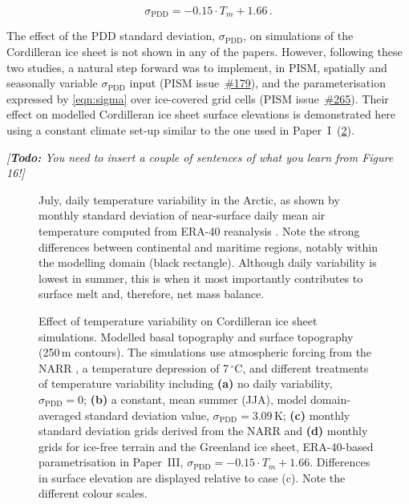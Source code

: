 \documentclass{article}
\newcommand{\todo}[1]{\emph{[\textbf{Todo:} #1]}}
\newcommand{\sPDD}[0]{\sigma_{\mathrm{PDD}}}
\newcommand{\unit}[1]{\ensuremath{\mathrm{#1}}}
\newcommand{\degree}[0]{\ensuremath{^{\circ}}}
\newcommand{\degC}[0]{\unit{{\degree}C}}
\newcommand{\CCLI}[0]{Paper~I}      %
\newcommand{\PSDP}[0]{Paper~III}    %
\newcommand{\issue}[1]{\href{https://github.com/pism/pism/issues/#1}{\##1}}
\begin{document}
\begin{equation}
    \label{eqn:sigma}
    \sPDD = -0.15 \cdot T_{m} + 1.66\,.
\end{equation}

The effect of the PDD standard deviation, $\sPDD$, on simulations of the
Cordilleran ice sheet is not shown in any of the papers. However, following
these two studies, a natural step forward was to implement, in PISM, spatially
and seasonally variable $\sPDD$ input (PISM issue~\issue{179}), and the
parameterisation expressed by \cref{eqn:sigma} over ice-covered grid cells
(PISM issue~\issue{265}). Their effect on modelled Cordilleran ice sheet
surface elevations is demonstrated here using a constant climate set-up similar
to the one used in \CCLI\ (\cref{fig:plot-sdeffect}).

\todo{You need to insert a couple of sentences of what you learn from Figure
      16!}

\begin{figure}
  \centering
  \caption{July, daily temperature variability in the Arctic, as shown by
           monthly standard deviation of near-surface daily mean air
           temperature computed from ERA-40 reanalysis
           \citep{Uppala.etal.2005}. Note the strong differences between
           continental and maritime regions, notably within the modelling domain
           (black rectangle). Although daily variability is lowest in summer,
           this is when it most importantly contributes to surface melt and,
           therefore, net mass balance.}
  \label{fig:plot-sdmap}
\end{figure}

\begin{figure}
  \centering
  \caption{Effect of temperature variability on Cordilleran ice sheet
           simulations. Modelled basal topography and surface topography
           (250\,m contours). The simulations use atmospheric forcing from the
           NARR \citep{Mesinger.etal.2006}, a temperature depression of
           7\,\degC, and different treatments of temperature variability
           including
           \textbf{(a)} no daily variability, $\sPDD=0$;
           \textbf{(b)} a constant, mean summer (JJA), model domain-averaged
           standard deviation value, $\sPDD=3.09$\,K;
           \textbf{(c)} monthly standard deviation grids derived from the NARR
           and
           \textbf{(d)} monthly grids for ice-free terrain and the
           Greenland ice sheet, ERA-40-based \citep{Uppala.etal.2005}
           parametrisation in \PSDP, ${\sPDD=-0.15\cdot{T_m}+1.66}$.
           Differences in surface elevation are displayed relative to case (c).
           Note the different colour scales.}
  \label{fig:plot-sdeffect}
\end{figure}
\end{document}
